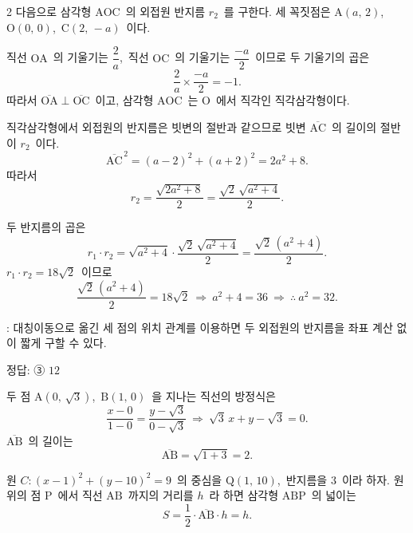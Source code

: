 \documentclass[10pt,fleqn]{article}
\begin{document}
\begin{multicols*}{2}
다음으로 삼각형 $\mathrm{AOC}$\ 의 외접원 반지름 $r_2$\ 를 구한다. 세 꼭짓점은 $\mathrm{A}(a,\,2)$,\ $\mathrm{O}(0,\,0)$,\ $\mathrm{C}(2,\,-a)$\ 이다.

직선 $\mathrm{OA}$\ 의 기울기는 $\dfrac{2}{a}$,\ 직선 $\mathrm{OC}$\ 의 기울기는 $\dfrac{-a}{2}$\ 이므로 두 기울기의 곱은
\[ \dfrac{2}{a} \times \dfrac{-a}{2} = -1. \]
따라서 $\overline{\mathrm{OA}} \perp \overline{\mathrm{OC}}$\ 이고, 삼각형 $\mathrm{AOC}$\ 는 $\mathrm{O}$\ 에서 직각인 직각삼각형이다.

직각삼각형에서 외접원의 반지름은 빗변의 절반과 같으므로 빗변 $\overline{\mathrm{AC}}$\ 의 길이의 절반이 $r_2$\ 이다.
\[ \overline{\mathrm{AC}}^{\,2} = (a-2)^2 + (a+2)^2 = 2a^2 + 8. \]
따라서
\[ r_2 = \dfrac{\sqrt{2a^2 + 8}}{2} = \dfrac{\sqrt{2}\,\sqrt{a^2 + 4}}{2}. \]

두 반지름의 곱은
\[ r_1 \cdot r_2 = \sqrt{a^2 + 4} \cdot \dfrac{\sqrt{2}\,\sqrt{a^2 + 4}}{2} = \dfrac{\sqrt{2}\,(a^2 + 4)}{2}. \]
$r_1 \cdot r_2 = 18\sqrt{2}$\ 이므로
\[ \dfrac{\sqrt{2}\,(a^2 + 4)}{2} = 18\sqrt{2}\ \Longrightarrow\ a^2 + 4 = 36\ \Longrightarrow\ \therefore\ a^2 = 32. \]

\begin{dmcriticalpoint}
: 대칭이동으로 옮긴 세 점의 위치 관계를 이용하면 두 외접원의 반지름을 좌표 계산 없이 짧게 구할 수 있다.
\end{dmcriticalpoint}

\begin{dmanswerbox}
정답: ③ $12$
\end{dmanswerbox}

두 점 $\mathrm{A}(0,\,\sqrt{3})$,\ $\mathrm{B}(1,\,0)$\ 을 지나는 직선의 방정식은
\[ \dfrac{x-0}{1-0} = \dfrac{y - \sqrt{3}}{0 - \sqrt{3}}\ \Longrightarrow\ \sqrt{3}\,x + y - \sqrt{3} = 0. \]
$\overline{\mathrm{AB}}$\ 의 길이는
\[ \overline{\mathrm{AB}} = \sqrt{1 + 3} = 2. \]

원 $C: (x-1)^2 + (y-10)^2 = 9$\ 의 중심을 $\mathrm{Q}(1,\,10)$,\ 반지름을 $3$\ 이라 하자. 원 위의 점 $\mathrm{P}$\ 에서 직선 $\mathrm{AB}$\ 까지의 거리를 $h$\ 라 하면 삼각형 $\mathrm{ABP}$\ 의 넓이는
\[ S = \dfrac{1}{2} \cdot \overline{\mathrm{AB}} \cdot h = h. \]


\end{multicols*}
\end{document}
